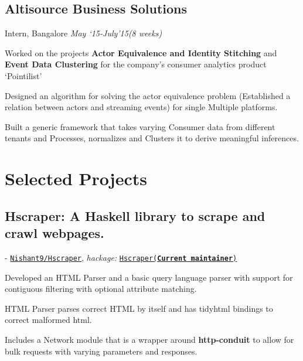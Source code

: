\documentclass[a4paper]{twentysecondcv} %
\begin{document}
\subsection{ \textbf{Altisource Business Solutions} }
\vspace{-2mm}
Intern, Bangalore \hfill \emph{May `15-July'15(8 weeks)}\\
\vspace{-3mm}
\begin{list3}
\item Worked on the projects \textbf{Actor Equivalence and Identity Stitching} and \textbf{Event Data Clustering} for the company's consumer analytics product `Pointilist'
\item Designed an algorithm for solving the actor equivalence problem (Established a relation between actors and streaming events) for single Multiple platforms.
\item Built a generic framework that takes varying Consumer data from different tenants and Processes, normalizes and Clusters it to derive meaningful inferences.
  \newline
  \newline
  \newline
\end{list3} 

\vspace{-2mm}
\section{Selected Projects}
\vspace{-2mm}
\subsection{\textbf{Hscraper: A Haskell library to scrape and crawl webpages.}}
\vspace{-2mm}
\hspace{1mm}- \faGithub
\href{http://www.github.com/Nishant9/Hscraper}{\texttt{Nishant9/Hscraper}}, 
\textit{hackage:}
\href{https://hackage.haskell.org/package/hScraper}{\texttt{Hscraper(\textbf{Current maintainer})}}
\hfill
\vspace{1mm}
\begin{list3} \itemsep -0.5pt
\item Developed an HTML Parser and a basic query language parser with support for contiguous filtering with optional attribute matching.
\item HTML Parser parses correct HTML by itself and has tidyhtml
  bindings to correct malformed html.
\item Includes a Network module that is a wrapper around
  \textbf{http-conduit} to allow for bulk requests with varying
  parameters and responses.
  \newline
  \newline
\end{list3}
\end{document}

